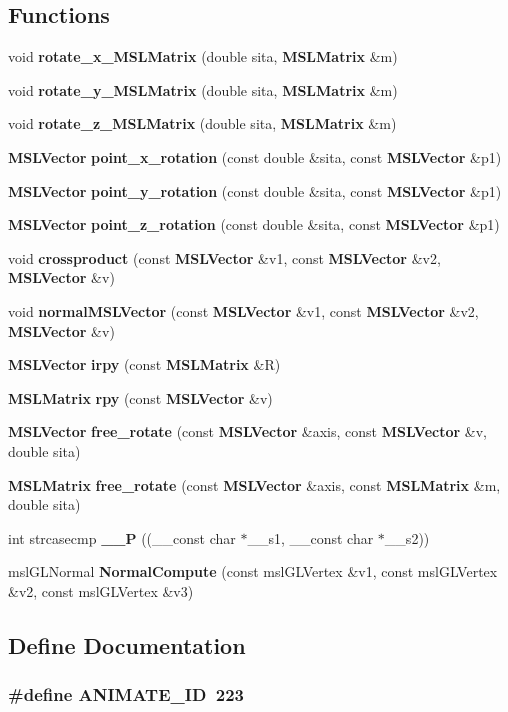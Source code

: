 \subsection*{Functions}
\begin{CompactItemize}
\item 
void {\bf rotate\_\-x\_\-MSLMatrix} (double sita, {\bf MSLMatrix} \&m)
\item 
void {\bf rotate\_\-y\_\-MSLMatrix} (double sita, {\bf MSLMatrix} \&m)
\item 
void {\bf rotate\_\-z\_\-MSLMatrix} (double sita, {\bf MSLMatrix} \&m)
\item 
{\bf MSLVector} {\bf point\_\-x\_\-rotation} (const double \&sita, const {\bf MSLVector} \&p1)
\item 
{\bf MSLVector} {\bf point\_\-y\_\-rotation} (const double \&sita, const {\bf MSLVector} \&p1)
\item 
{\bf MSLVector} {\bf point\_\-z\_\-rotation} (const double \&sita, const {\bf MSLVector} \&p1)
\item 
void {\bf crossproduct} (const {\bf MSLVector} \&v1, const {\bf MSLVector} \&v2, {\bf MSLVector} \&v)
\item 
void {\bf normal\-MSLVector} (const {\bf MSLVector} \&v1, const {\bf MSLVector} \&v2, {\bf MSLVector} \&v)
\item 
{\bf MSLVector} {\bf irpy} (const {\bf MSLMatrix} \&R)
\item 
{\bf MSLMatrix} {\bf rpy} (const {\bf MSLVector} \&v)
\item 
{\bf MSLVector} {\bf free\_\-rotate} (const {\bf MSLVector} \&axis, const {\bf MSLVector} \&v, double sita)
\item 
{\bf MSLMatrix} {\bf free\_\-rotate} (const {\bf MSLVector} \&axis, const {\bf MSLMatrix} \&m, double sita)
\item 
int strcasecmp {\bf \_\-\_\-P} ((\_\-\_\-const char $\ast$\_\-\_\-s1, \_\-\_\-const char $\ast$\_\-\_\-s2))
\item 
msl\-GLNormal {\bf Normal\-Compute} (const msl\-GLVertex \&v1, const msl\-GLVertex \&v2, const msl\-GLVertex \&v3)
\end{CompactItemize}


\subsection{Define Documentation}
\subsubsection{\setlength{\rightskip}{0pt plus 5cm}\#define ANIMATE\_\-ID\ 223}\label{renderglobj_h_a34}



